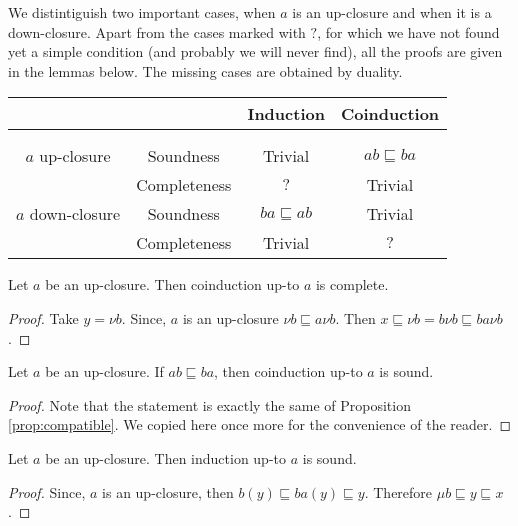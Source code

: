 \documentclass{llncs}
\begin{document}
We distintiguish two important cases, when $a$ is an up-closure and when it is a down-closure.  Apart from the cases marked with $?$, for which we have not found yet a simple condition (and probably we will never find), all the proofs are given in the lemmas below. The missing cases are obtained by duality.

\begin{center}
\begin{tabular}{cccc}
& & Induction & Coinduction \\
\hline \\
\hline \\
$a$ up-closure  & Soundness & Trivial & $ab\sqsubseteq ba$ \\
                          & Completeness & $?$ & Trivial \\
                     \hline
$a$ down-closure  & Soundness & $ba\sqsubseteq ab$ & Trivial \\
                          & Completeness & Trivial & $?$ \\                          
\end{tabular}
\end{center}



\begin{lemma}
Let $a$ be an up-closure. Then coinduction up-to $a$ is complete.
\end{lemma}
\begin{proof} 
Take $y=\nu b$. Since, $a$ is an up-closure $\nu b \sqsubseteq a \nu b$. Then $x\sqsubseteq \nu b =b \nu b \sqsubseteq ba\nu b$.
\end{proof}

\begin{lemma}
Let $a$ be an up-closure. If $ab\sqsubseteq ba$, then coinduction up-to $a$ is sound.
\end{lemma}
\begin{proof}
Note that the statement is exactly the same of Proposition \ref{prop:compatible}. We copied here once more for the convenience of the reader.
\end{proof}


\begin{lemma}
Let $a$ be an up-closure. Then induction up-to $a$ is sound.
\end{lemma}
\begin{proof} 
Since, $a$ is an up-closure, then $b(y) \sqsubseteq ba(y) \sqsubseteq y$. Therefore $\mu b \sqsubseteq y \sqsubseteq x$.
\end{proof}
\end{document}

